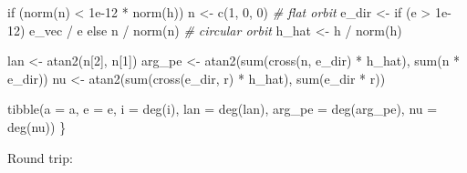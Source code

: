 \documentclass[
  10.5pt,
  letterpaper,
]{scrbook}
\newenvironment{Shaded}{\begin{snugshade}}{\end{snugshade}}
\newcommand{\AttributeTok}[1]{\textcolor[rgb]{0.00,0.00,0.00}{#1}}
\newcommand{\CommentTok}[1]{\textcolor[rgb]{0.00,0.00,0.00}{\textit{#1}}}
\newcommand{\ControlFlowTok}[1]{\textcolor[rgb]{0.00,0.00,0.00}{#1}}
\newcommand{\DecValTok}[1]{\textcolor[rgb]{0.00,0.00,0.00}{#1}}
\newcommand{\FloatTok}[1]{\textcolor[rgb]{0.00,0.00,0.00}{#1}}
\newcommand{\FunctionTok}[1]{\textcolor[rgb]{0.00,0.00,0.00}{#1}}
\newcommand{\NormalTok}[1]{\textcolor[rgb]{0.00,0.00,0.00}{#1}}
\newcommand{\OtherTok}[1]{\textcolor[rgb]{0.00,0.00,0.00}{#1}}
\newcommand{\SpecialCharTok}[1]{\textcolor[rgb]{0.00,0.00,0.00}{#1}}
\theoremstyle{plain}
\theoremstyle{remark}
\begin{document}
\begin{Shaded}
\begin{Highlighting}[]
  \ControlFlowTok{if}\NormalTok{ (}\FunctionTok{norm}\NormalTok{(n) }\SpecialCharTok{\textless{}} \FloatTok{1e{-}12} \SpecialCharTok{*} \FunctionTok{norm}\NormalTok{(h)) n }\OtherTok{\textless{}{-}} \FunctionTok{c}\NormalTok{(}\DecValTok{1}\NormalTok{, }\DecValTok{0}\NormalTok{, }\DecValTok{0}\NormalTok{)       }\CommentTok{\# flat orbit}
\NormalTok{  e\_dir }\OtherTok{\textless{}{-}} \ControlFlowTok{if}\NormalTok{ (e }\SpecialCharTok{\textgreater{}} \FloatTok{1e{-}12}\NormalTok{) e\_vec }\SpecialCharTok{/}\NormalTok{ e }\ControlFlowTok{else}\NormalTok{ n }\SpecialCharTok{/} \FunctionTok{norm}\NormalTok{(n)   }\CommentTok{\# circular orbit}
\NormalTok{  h\_hat }\OtherTok{\textless{}{-}}\NormalTok{ h }\SpecialCharTok{/} \FunctionTok{norm}\NormalTok{(h)}

\NormalTok{  lan    }\OtherTok{\textless{}{-}} \FunctionTok{atan2}\NormalTok{(n[}\DecValTok{2}\NormalTok{], n[}\DecValTok{1}\NormalTok{])}
\NormalTok{  arg\_pe }\OtherTok{\textless{}{-}} \FunctionTok{atan2}\NormalTok{(}\FunctionTok{sum}\NormalTok{(}\FunctionTok{cross}\NormalTok{(n, e\_dir) }\SpecialCharTok{*}\NormalTok{ h\_hat), }\FunctionTok{sum}\NormalTok{(n }\SpecialCharTok{*}\NormalTok{ e\_dir))}
\NormalTok{  nu     }\OtherTok{\textless{}{-}} \FunctionTok{atan2}\NormalTok{(}\FunctionTok{sum}\NormalTok{(}\FunctionTok{cross}\NormalTok{(e\_dir, r) }\SpecialCharTok{*}\NormalTok{ h\_hat), }\FunctionTok{sum}\NormalTok{(e\_dir }\SpecialCharTok{*}\NormalTok{ r))}

  \FunctionTok{tibble}\NormalTok{(}\AttributeTok{a =}\NormalTok{ a, }\AttributeTok{e =}\NormalTok{ e, }\AttributeTok{i =} \FunctionTok{deg}\NormalTok{(i), }\AttributeTok{lan =} \FunctionTok{deg}\NormalTok{(lan),}
         \AttributeTok{arg\_pe =} \FunctionTok{deg}\NormalTok{(arg\_pe), }\AttributeTok{nu =} \FunctionTok{deg}\NormalTok{(nu))}
\NormalTok{\}}
\end{Highlighting}
\end{Shaded}

Round trip:

\begin{Shaded}
\end{Shaded}
\end{document}
